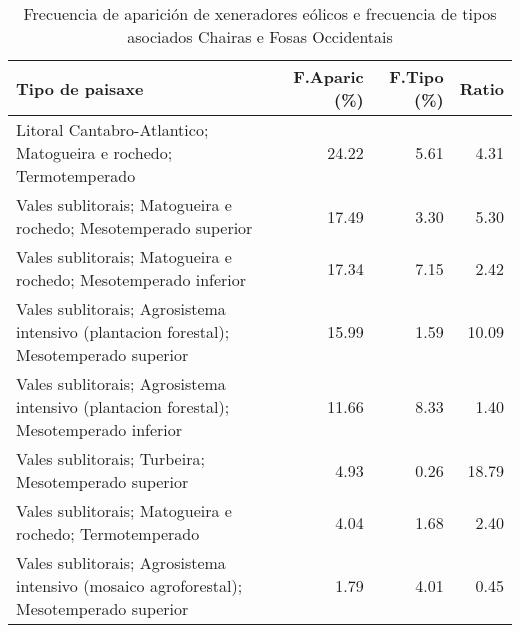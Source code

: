\begin{table}[p]
\centering
\caption{Frecuencia de aparición de xeneradores eólicos e frecuencia de tipos asociados Chairas e Fosas Occidentais} 
\label{veolico11}
\begin{tabular}{lrrr}
  \hline
Tipo de paisaxe & F.Aparic (\%) & F.Tipo (\%) & Ratio \\ 
  \hline
Litoral Cantabro-Atlantico; Matogueira e rochedo; Termotemperado & 24.22 & 5.61 & 4.31 \\ 
  Vales sublitorais; Matogueira e rochedo; Mesotemperado superior & 17.49 & 3.30 & 5.30 \\ 
  Vales sublitorais; Matogueira e rochedo; Mesotemperado inferior & 17.34 & 7.15 & 2.42 \\ 
  Vales sublitorais; Agrosistema intensivo (plantacion forestal); Mesotemperado superior & 15.99 & 1.59 & 10.09 \\ 
  Vales sublitorais; Agrosistema intensivo (plantacion forestal); Mesotemperado inferior & 11.66 & 8.33 & 1.40 \\ 
  Vales sublitorais; Turbeira; Mesotemperado superior & 4.93 & 0.26 & 18.79 \\ 
  Vales sublitorais; Matogueira e rochedo; Termotemperado & 4.04 & 1.68 & 2.40 \\ 
  Vales sublitorais; Agrosistema intensivo (mosaico agroforestal); Mesotemperado superior & 1.79 & 4.01 & 0.45 \\ 
   \hline
\end{tabular}
\end{table}
